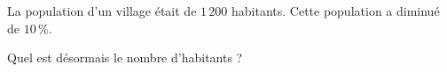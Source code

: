 
La population d'un village était de $1\,200$ habitants. Cette population a diminué de $10\,\%$.

Quel est désormais le nombre d'habitants ?

\smallskip

